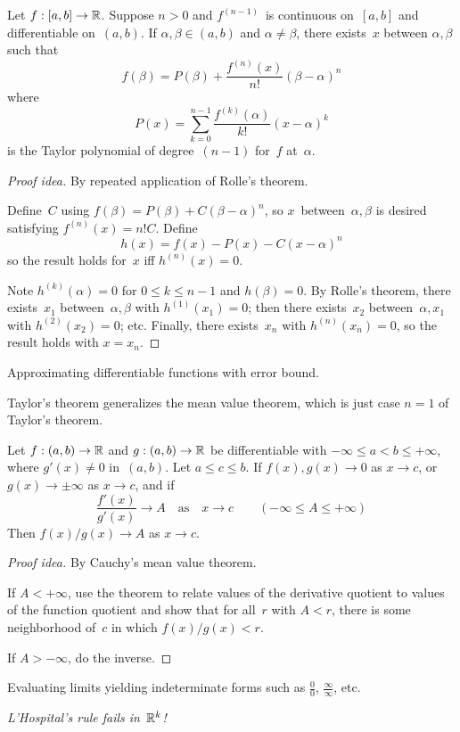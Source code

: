 \begin{thm}[Taylor]
Let \(f:[a,b]\to\mathbb{R}\). Suppose \(n>0\) and \(f^{(n-1)}\)~is continuous on~\([a,b]\) and differentiable on~\((a,b)\). If \(\alpha,\beta\in(a,b)\) and \(\alpha\ne\beta\), there exists~\(x\) between \(\alpha,\beta\) such that
\[f(\beta)=P(\beta)+\frac{f^{(n)}(x)}{n!}(\beta-\alpha)^n\]
where
\[P(x)=\sum_{k=0}^{n-1}\frac{f^{(k)}(\alpha)}{k!}(x-\alpha)^k\]
is the Taylor polynomial of degree~\((n-1)\) for~\(f\) at~\(\alpha\).
\end{thm}
\begin{proof}[Proof idea]
By repeated application of Rolle's theorem.

Define~\(C\) using \(f(\beta)=P(\beta)+C(\beta-\alpha)^n\), so \(x\)~between~\(\alpha,\beta\) is desired satisfying \(f^{(n)}(x)=n!C\). Define
\[h(x)=f(x)-P(x)-C(x-\alpha)^n\]
so the result holds for~\(x\) iff \(h^{(n)}(x)=0\).

Note \(h^{(k)}(\alpha)=0\) for \(0\le k\le n-1\) and \(h(\beta)=0\). By Rolle's theorem, there exists~\(x_1\) between~\(\alpha,\beta\) with \(h^{(1)}(x_1)=0\); then there exists~\(x_2\) between~\(\alpha,x_1\) with \(h^{(2)}(x_2)=0\); etc. Finally, there exists~\(x_n\) with \(h^{(n)}(x_n)=0\), so the result holds with \(x=x_n\).
\end{proof}
\begin{app}
Approximating differentiable functions with error bound.
\end{app}
\begin{rmk}
Taylor's theorem generalizes the mean value theorem, which is just case \(n=1\) of Taylor's theorem.
\end{rmk}

\begin{thm}[L'Hospital]
Let \(f:(a,b)\to\mathbb{R}\) and \(g:(a,b)\to\mathbb{R}\) be differentiable with \(-\infty\le a<b\le+\infty\), where \(g'(x)\ne0\) in~\((a,b)\). Let \(a\le c\le b\). If \(f(x),g(x)\to0\) as \(x\to c\), or \(g(x)\to\pm\infty\) as \(x\to c\), and if
\[\frac{f'(x)}{g'(x)}\to A\quad\text{as}\quad x\to c\qquad(-\infty\le A\le+\infty)\]
Then \(f(x)/g(x)\to A\) as \(x\to c\).
\end{thm}
\begin{proof}[Proof idea]
By Cauchy's mean value theorem.

If \(A<+\infty\), use the theorem to relate values of the derivative quotient to values of the function quotient and show that for all~\(r\) with \(A<r\), there is some neighborhood of~\(c\) in which \(f(x)/g(x)<r\).

If \(A>-\infty\), do the inverse.
\end{proof}
\begin{app}
Evaluating limits yielding indeterminate forms such as \(\frac{0}{0}\), \(\frac{\infty}{\infty}\), etc.
\end{app}
\begin{rmk}
\emph{L'Hospital's rule fails in~\(\mathbb{R}^k\)!}
\end{rmk}

